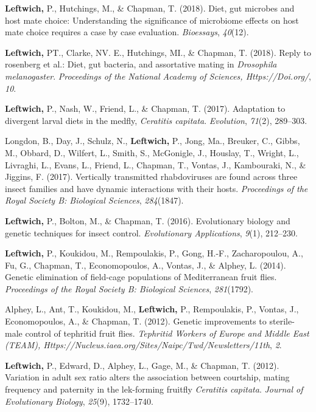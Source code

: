 \documentclass[11pt, a4paper]{awesome-cv}
\begin{document}
\leavevmode\hypertarget{ref-12}{}%
\textbf{Leftwich,} P., Hutchings, M., \& Chapman, T. (2018). Diet, gut
microbes and host mate choice: Understanding the significance of
microbiome effects on host mate choice requires a case by case
evaluation. \emph{Bioessays}, \emph{40}(12).

\leavevmode\hypertarget{ref-8}{}%
\textbf{Leftwich,} PT., Clarke, NV. E., Hutchings, MI., \& Chapman, T.
(2018). Reply to rosenberg et al.: Diet, gut bacteria, and assortative
mating in \emph{{Drosophila} melanogaster}. \emph{Proceedings of the
National Academy of Sciences, Https://Doi.org/}, \emph{10}.

\leavevmode\hypertarget{ref-9}{}%
\textbf{Leftwich,} P., Nash, W., Friend, L., \& Chapman, T. (2017).
Adaptation to divergent larval diets in the medfly, \emph{{Ceratitis}
capitata}. \emph{Evolution}, \emph{71}(2), 289--303.

\leavevmode\hypertarget{ref-7}{}%
Longdon, B., Day, J., Schulz, N., \textbf{Leftwich,} P., Jong, Ma.,
Breuker, C., Gibbs, M., Obbard, D., Wilfert, L., Smith, S., McGonigle,
J., Houslay, T., Wright, L., Livraghi, L., Evans, L., Friend, L.,
Chapman, T., Vontas, J., Kambouraki, N., \& Jiggins, F. (2017).
Vertically transmitted rhabdoviruses are found across three insect
families and have dynamic interactions with their hosts.
\emph{Proceedings of the Royal Society B: Biological Sciences},
\emph{284}(1847).

\leavevmode\hypertarget{ref-1}{}%
\textbf{Leftwich,} P., Bolton, M., \& Chapman, T. (2016). Evolutionary
biology and genetic techniques for insect control. \emph{Evolutionary
Applications}, \emph{9}(1), 212--230.

\leavevmode\hypertarget{ref-2}{}%
\textbf{Leftwich,} P., Koukidou, M., Rempoulakis, P., Gong, H.-F.,
Zacharopoulou, A., Fu, G., Chapman, T., Economopoulos, A., Vontas, J.,
\& Alphey, L. (2014). Genetic elimination of field-cage populations of
{Mediterranean} fruit flies. \emph{Proceedings of the Royal Society B:
Biological Sciences}, \emph{281}(1792).

\leavevmode\hypertarget{ref-18}{}%
Alphey, L., Ant, T., Koukidou, M., \textbf{Leftwich,} P., Rempoulakis,
P., Vontas, J., Economopoulos, A., \& Chapman, T. (2012). Genetic
improvements to sterile-male control of tephritid fruit flies.
\emph{Tephritid Workers of Europe and Middle East (TEAM),
Https://Nucleus.iaea.org/Sites/Naipc/Twd/Newsletters/11th}, \emph{2}.

\leavevmode\hypertarget{ref-4}{}%
\textbf{Leftwich,} P., Edward, D., Alphey, L., Gage, M., \& Chapman, T.
(2012). Variation in adult sex ratio alters the association between
courtship, mating frequency and paternity in the lek-forming fruitfly
\emph{{Ceratitis} capitata}. \emph{Journal of Evolutionary Biology},
\emph{25}(9), 1732--1740.
\end{document}
